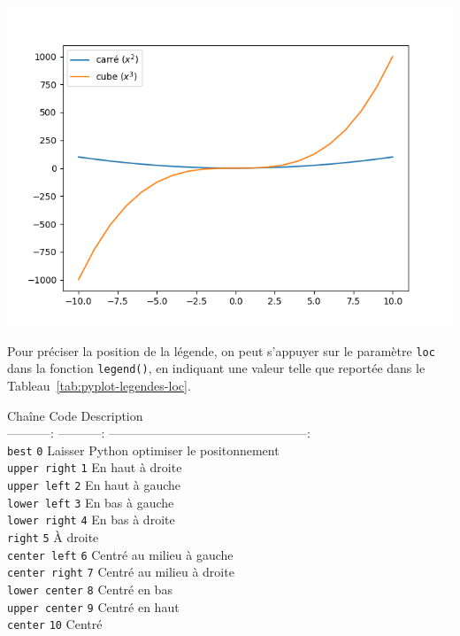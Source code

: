 \documentclass[12pt,]{book}
\numberwithin{equation}{section}
\numberwithin{countremarque}{section}
\begin{document}
\begin{center}\includegraphics[width=9.03in]{figs/pyplot/plot_legende} \end{center}

Pour préciser la position de la légende, on peut s'appuyer sur le
paramètre \texttt{loc} dans la fonction \texttt{legend()}, en indiquant
une valeur telle que reportée dans le
Tableau~\ref{tab:pyplot-legendes-loc}.

Chaîne \textbar{} Code \textbar{} Description \textbar{}\\
-----------: \textbar{} \textbar{} -----------: \textbar{}
------------------------------------------------:\textbar{}\\
\texttt{best} \textbar{} \texttt{0} \textbar{} Laisser Python optimiser
le positonnement \textbar{}\\
\texttt{upper\ right} \textbar{} \texttt{1} \textbar{} En haut à droite
\textbar{}\\
\texttt{upper\ left} \textbar{} \texttt{2} \textbar{} En haut à gauche
\textbar{}\\
\texttt{lower\ left} \textbar{} \texttt{3} \textbar{} En bas à gauche
\textbar{}\\
\texttt{lower\ right} \textbar{} \texttt{4} \textbar{} En bas à droite
\textbar{}\\
\texttt{right} \textbar{} \texttt{5} \textbar{} À droite \textbar{}\\
\texttt{center\ left} \textbar{} \texttt{6} \textbar{} Centré au milieu
à gauche \textbar{}\\
\texttt{center\ right} \textbar{} \texttt{7} \textbar{} Centré au milieu
à droite \textbar{}\\
\texttt{lower\ center} \textbar{} \texttt{8} \textbar{} Centré en bas
\textbar{}\\
\texttt{upper\ center} \textbar{} \texttt{9} \textbar{} Centré en haut
\textbar{}\\
\texttt{center} \textbar{} \texttt{10} \textbar{} Centré \textbar{}
\end{document}
